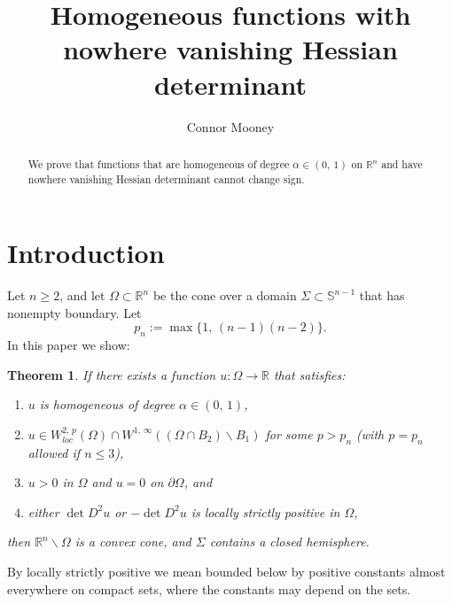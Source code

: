 \documentclass{amsart}
\newtheorem{thm}{Theorem}[section]
\theoremstyle{definition}
\theoremstyle{remark}
\begin{document}
\title[nowhere vanishing Hessian determinant]{Homogeneous functions with nowhere vanishing Hessian determinant}
\author{Connor Mooney}
\address{Department of Mathematics, UC Irvine}

\begin{abstract}
We prove that functions that are homogeneous of degree $\alpha \in (0,\,1)$ on $\mathbb{R}^n$ and have nowhere vanishing Hessian determinant cannot change sign.
\end{abstract}
\maketitle


\section{Introduction}

Let $n \geq 2$, and let $\Omega \subset \mathbb{R}^n$ be the cone over a domain $\Sigma \subset \mathbb{S}^{n-1}$ that has nonempty boundary. Let 
$$p_n := \max\{1,\, (n-1)(n-2)\}.$$ 
In this paper we show:

\begin{thm}\label{Main}
If there exists a function $u : \Omega \rightarrow \mathbb{R}$ that satisfies:
\begin{enumerate}[label=(\roman*)]
\item $u$ is homogeneous of degree $\alpha \in (0,\,1)$,
\item $u \in W^{2,\,p}_{loc}(\Omega) \cap W^{1,\,\infty}((\Omega \cap B_2) \backslash B_1)$ for some $p > p_n$ (with $p = p_n$ allowed if $n \leq 3$),
\item $u > 0$ in $\Omega$ and $u = 0$ on $\partial \Omega$, and
\item either $\det D^2u$ or $-\det D^2u$ is locally strictly positive in $\Omega$,
\end{enumerate}
then $\mathbb{R}^n \backslash \Omega$ is a convex cone, and $\Sigma$ contains a closed hemisphere.
\end{thm}

\noindent By locally strictly positive we mean bounded below by positive constants almost everywhere on compact sets, where the constants may depend on the sets.
\end{document}
